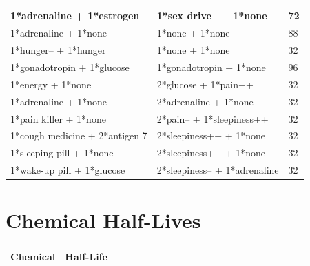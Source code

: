 \documentclass{article}
\begin{document}
\begin{longtable}{|p{5cm}|p{5cm}|p{2cm}|}
1*adrenaline + 1*estrogen & 1*sex drive-- + 1*none & 72 \\ \hline
1*adrenaline + 1*none & 1*none + 1*none & 88 \\ \hline
1*hunger-- + 1*hunger & 1*none + 1*none & 32 \\ \hline
1*gonadotropin + 1*glucose & 1*gonadotropin + 1*none & 96 \\ \hline
1*energy + 1*none & 2*glucose + 1*pain++ & 32 \\ \hline
1*adrenaline + 1*none & 2*adrenaline + 1*none & 32 \\ \hline
1*pain killer + 1*none & 2*pain-- + 1*sleepiness++ & 32 \\ \hline
1*cough medicine + 2*antigen 7 & 2*sleepiness++ + 1*none & 32 \\ \hline
1*sleeping pill + 1*none & 2*sleepiness++ + 1*none & 32 \\ \hline
1*wake-up pill + 1*glucose & 2*sleepiness-- + 1*adrenaline & 32 \\ \hline
\end{longtable}

\section*{Chemical Half-Lives}

\begin{longtable}{|p{4cm}|p{4cm}|}
\hline
{\bf Chemical} & {\bf Half-Life} \\ \hline
\end{longtable}
\end{document}
